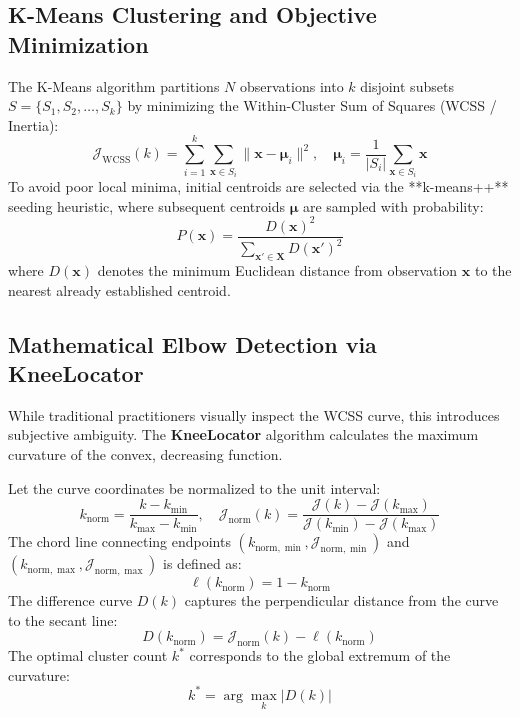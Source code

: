 \documentclass[11pt,a4paper]{article}
\begin{document}
\subsection{K-Means Clustering and Objective Minimization}
The K-Means algorithm partitions $N$ observations into $k$ disjoint subsets $S = \{S_1, S_2, \dots, S_k\}$ by minimizing the Within-Cluster Sum of Squares (WCSS / Inertia):
\begin{equation}
    \mathcal{J}_{\text{WCSS}}(k) = \sum_{i=1}^k \sum_{\mathbf{x} \in S_i} \|\mathbf{x} - \boldsymbol{\mu}_i\|^2, \quad \boldsymbol{\mu}_i = \frac{1}{|S_i|} \sum_{\mathbf{x} \in S_i} \mathbf{x}
\end{equation}
To avoid poor local minima, initial centroids are selected via the **k-means++** seeding heuristic, where subsequent centroids $\boldsymbol{\mu}$ are sampled with probability:
\begin{equation}
    P(\mathbf{x}) = \frac{D(\mathbf{x})^2}{\sum_{\mathbf{x}' \in \mathbf{X}} D(\mathbf{x}')^2}
\end{equation}
where $D(\mathbf{x})$ denotes the minimum Euclidean distance from observation $\mathbf{x}$ to the nearest already established centroid.

\subsection{Mathematical Elbow Detection via KneeLocator}
While traditional practitioners visually inspect the WCSS curve, this introduces subjective ambiguity. The \textbf{KneeLocator} algorithm calculates the maximum curvature of the convex, decreasing function. 

Let the curve coordinates be normalized to the unit interval:
\begin{equation}
    k_{\text{norm}} = \frac{k - k_{\min}}{k_{\max} - k_{\min}}, \quad \mathcal{J}_{\text{norm}}(k) = \frac{\mathcal{J}(k) - \mathcal{J}(k_{\max})}{\mathcal{J}(k_{\min}) - \mathcal{J}(k_{\max})}
\end{equation}
The chord line connecting endpoints $(k_{\text{norm}, \min}, \mathcal{J}_{\text{norm}, \min})$ and $(k_{\text{norm}, \max}, \mathcal{J}_{\text{norm}, \max})$ is defined as:
\begin{equation}
    \ell(k_{\text{norm}}) = 1 - k_{\text{norm}}
\end{equation}
The difference curve $D(k)$ captures the perpendicular distance from the curve to the secant line:
\begin{equation}
    D(k_{\text{norm}}) = \mathcal{J}_{\text{norm}}(k) - \ell(k_{\text{norm}})
\end{equation}
The optimal cluster count $k^*$ corresponds to the global extremum of the curvature:
\begin{equation}
    k^* = \arg\max_{k} |D(k)|
\end{equation}
\end{document}
